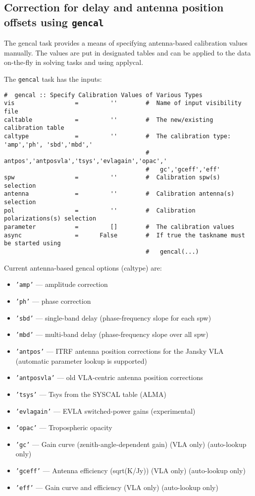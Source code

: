 \subsection{Correction for delay and antenna position offsets 
   using {\tt gencal}}
\label{section:cal.prior.gencal}


The gencal task provides a means of specifying antenna-based
calibration values manually.  The values are put in designated tables
and can be applied to the data on-the-fly in solving tasks and 
using applycal.

The {\tt gencal} task has the inputs:
\small
\begin{verbatim}
#  gencal :: Specify Calibration Values of Various Types
vis                 =         ''        #  Name of input visibility file
caltable            =         ''        #  The new/existing calibration table
caltype             =         ''        #  The calibration type: 'amp','ph', 'sbd','mbd','
                                        #   antpos','antposvla','tsys','evlagain','opac','
                                        #   gc','gceff','eff'
spw                 =         ''        #  Calibration spw(s) selection
antenna             =         ''        #  Calibration antenna(s) selection
pol                 =         ''        #  Calibration polarizations(s) selection
parameter           =         []        #  The calibration values
async               =      False        #  If true the taskname must be started using
                                        #   gencal(...)

\end{verbatim}
\normalsize


Current antenna-based gencal options (caltype) are:
\begin{itemize}
   \item {\tt 'amp'} --- amplitude correction
   \item {\tt 'ph'} --- phase correction
   \item {\tt 'sbd'} --- single-band delay (phase-frequency slope for each spw)
   \item {\tt 'mbd'} --- multi-band delay (phase-frequency slope over all spw)
   \item {\tt 'antpos'} --- ITRF antenna position corrections for the
     Jansky VLA (automatic parameter lookup is supported)
   \item {\tt 'antposvla'} --- old VLA-centric antenna position
     corrections 
   \item {\tt 'tsys'} --- Tsys from the SYSCAL table (ALMA)
   \item {\tt 'evlagain'} --- EVLA switched-power gains (experimental)
   \item {\tt 'opac'} --- Tropospheric opacity
    \item {\tt 'gc'} --- Gain curve (zenith-angle-dependent gain) (VLA
    only) (auto-lookup only)
    \item {\tt 'gceff'} --- Antenna efficiency (sqrt(K/Jy)) (VLA only) (auto-lookup only)
    \item {\tt 'eff'} --- Gain curve and efficiency (VLA only) (auto-lookup only)
\end{itemize}

